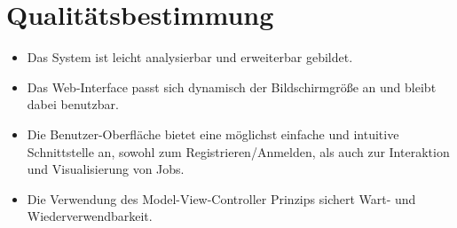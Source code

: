 \section{Qualitätsbestimmung}
\begin{itemize}    
    \item Das System ist leicht analysierbar und erweiterbar gebildet.
    \item Das Web-Interface passt sich dynamisch der Bildschirmgröße an und bleibt dabei benutzbar.
    \item Die Benutzer-Oberfläche bietet eine möglichst einfache und intuitive Schnittstelle an, sowohl zum Registrieren/Anmelden, als auch zur Interaktion und Visualisierung von Jobs.
    \item Die Verwendung des Model-View-Controller Prinzips sichert Wart- und Wiederverwendbarkeit.
\end{itemize}